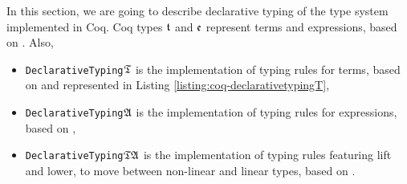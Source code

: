 In this section, we are going to describe declarative typing of the type system implemented in Coq.
%
Coq types $\mathfrak{t}$ and $\mathfrak{e}$ represent terms and expressions, based on .
Also,
\begin{itemize}
    \item \texttt{DeclarativeTyping}$\mathfrak{T}$ is the implementation of typing rules for terms, based on  and represented in Listing \ref{listing:coq-declarativetypingT},
    \item \texttt{DeclarativeTyping}$\mathfrak{A}$ is the implementation of typing rules for expressions, based on ,
    \item \texttt{DeclarativeTyping}$\mathfrak{T}\mathfrak{A}$ is the implementation of typing rules featuring lift and lower, to move between non-linear and linear types, based on .
\end{itemize}